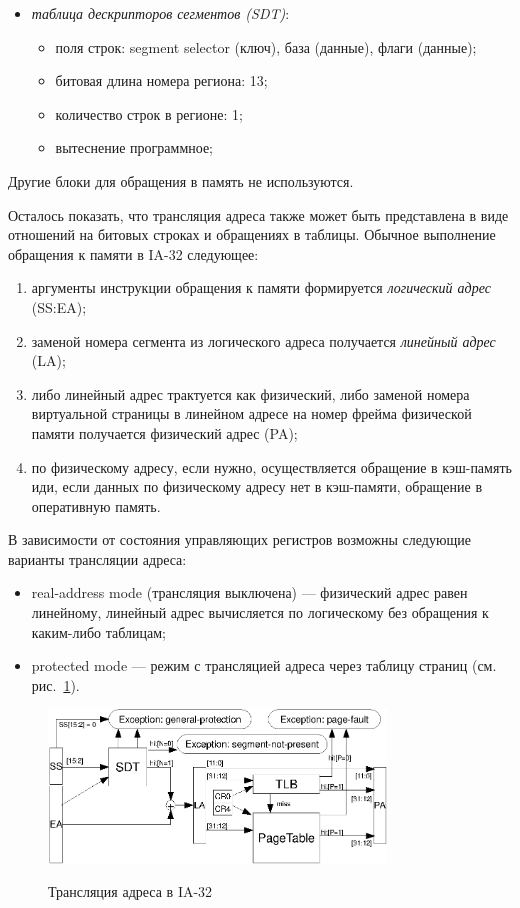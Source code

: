 \documentclass[14pt]{extreport}
\begin{document}
\begin{itemize}
  \item \emph{таблица дескрипторов сегментов (SDT)}:
        \begin{itemize}
            \item поля строк: segment selector (ключ), база (данные), флаги
(данные);
            \item битовая длина номера региона: 13;
            \item количество строк в регионе: 1;
            \item вытеснение программное;
        \end{itemize}
\end{itemize}

Другие блоки для обращения в память не используются.

Осталось показать, что трансляция адреса также может быть представлена в виде
отношений на битовых строках и обращениях в таблицы. Обычное выполнение
обращения к памяти в IA-32 следующее:
\begin{enumerate}
    \item аргументы инструкции обращения к памяти формируется \emph{логический
адрес} (SS:EA);
    \item заменой номера сегмента из логического адреса получается
\emph{линейный адрес} (LA);
    \item либо линейный адрес трактуется как физический, либо заменой номера
виртуальной страницы в линейном адресе на номер фрейма физической памяти
получается физический адрес (PA);
    \item по физическому адресу, если нужно, осуществляется обращение в
кэш-память иди, если данных по физическому адресу нет в кэш-памяти, обращение в
оперативную память.
\end{enumerate}

В зависимости от состояния управляющих регистров возможны следующие варианты
трансляции адреса:
\begin{itemize}
  \item real-address mode (трансляция выключена) --- физический адрес равен
линейному, линейный адрес вычисляется по логическому без обращения к каким-либо
таблицам;
  \item protected mode --- режим с трансляцией адреса через таблицу страниц (см.
рис.~\ref{fig:ia32_address_translation}).
\end{itemize}

\begin{figure}[h] \center
  \includegraphics[width=0.8\textwidth]{4.analysis/ia32_addrtrans}\\
  \caption{Трансляция адреса в IA-32}\label{fig:ia32_address_translation}
\end{figure}
\end{document}
